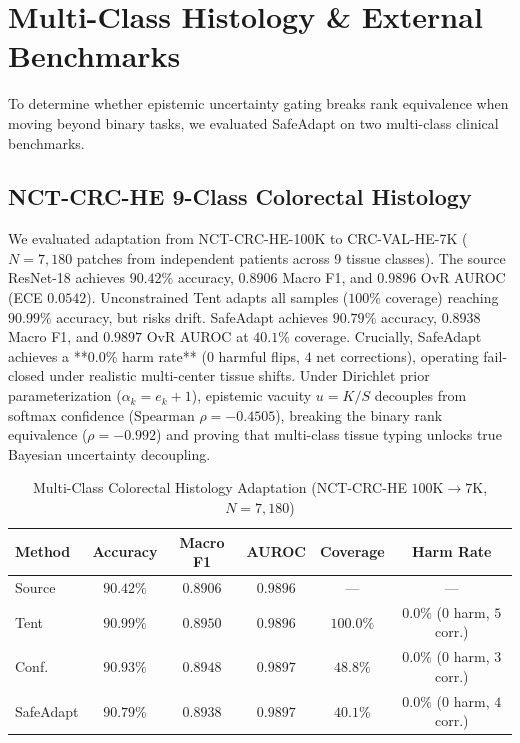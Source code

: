 \documentclass[conference]{IEEEtran}
\begin{document}
\section{Multi-Class Histology \& External Benchmarks}
\label{sec:multiclass}
To determine whether epistemic uncertainty gating breaks rank equivalence when moving beyond binary tasks, we evaluated SafeAdapt on two multi-class clinical benchmarks.

\subsection{NCT-CRC-HE 9-Class Colorectal Histology}
We evaluated adaptation from NCT-CRC-HE-100K to CRC-VAL-HE-7K ($N=7{,}180$ patches from independent patients across 9 tissue classes).
The source ResNet-18 achieves $90.42\%$ accuracy, $0.8906$ Macro F1, and $0.9896$ OvR AUROC (ECE $0.0542$).
Unconstrained Tent adapts all samples ($100\%$ coverage) reaching $90.99\%$ accuracy, but risks drift.
SafeAdapt achieves $90.79\%$ accuracy, $0.8938$ Macro F1, and $0.9897$ OvR AUROC at $40.1\%$ coverage.
Crucially, SafeAdapt achieves a **$0.0\%$ harm rate** ($0$ harmful flips, $4$ net corrections), operating fail-closed under realistic multi-center tissue shifts.
Under Dirichlet prior parameterization ($\alpha_k = e_k + 1$), epistemic vacuity $u = K/S$ decouples from softmax confidence ($\text{Spearman } \rho = -0.4505$), breaking the binary rank equivalence ($\rho = -0.992$) and proving that multi-class tissue typing unlocks true Bayesian uncertainty decoupling.

\begin{table}[t]
\caption{Multi-Class Colorectal Histology Adaptation (NCT-CRC-HE $100\text{K} \to 7\text{K}$, $N=7{,}180$)}
\label{tab:nctcrc}
\centering
\scriptsize
\begin{tabular}{lccccc}
\toprule
Method & Accuracy & Macro F1 & AUROC & Coverage & Harm Rate \\
\midrule
Source & $90.42\%$ & $0.8906$ & $0.9896$ & --- & --- \\
Tent   & $90.99\%$ & $0.8950$ & $0.9896$ & $100.0\%$ & $\mathbf{0.0\%}$ ($0$ harm, $5$ corr.) \\
Conf.  & $90.93\%$ & $0.8948$ & $0.9897$ & $48.8\%$ & $\mathbf{0.0\%}$ ($0$ harm, $3$ corr.) \\
SafeAdapt & $90.79\%$ & $0.8938$ & $0.9897$ & $40.1\%$ & $\mathbf{0.0\%}$ ($0$ harm, $4$ corr.) \\
\bottomrule
\end{tabular}
\end{table}
\end{document}
